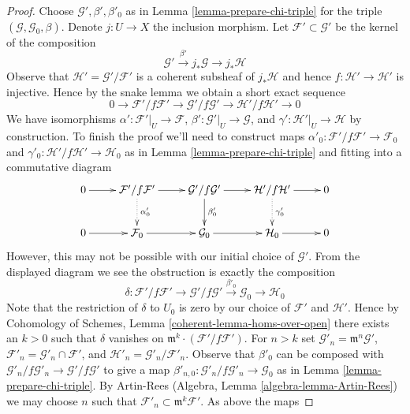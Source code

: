 \documentclass{stacks-project}
\theoremstyle{plain}
\theoremstyle{definition}
\theoremstyle{remark}
\numberwithin{equation}{subsection}
\begin{document}
\begin{proof}
Choose $\mathcal{G}', \beta', \beta'_0$ as in
Lemma \ref{lemma-prepare-chi-triple}
for the triple $(\mathcal{G}, \mathcal{G}_0, \beta)$.
Denote $j : U \to X$ the inclusion morphism.
Let $\mathcal{F}' \subset \mathcal{G}'$
be the kernel of the composition
$$
\mathcal{G}' \xrightarrow{\beta'} j_*\mathcal{G} \to j_*\mathcal{H}
$$
Observe that $\mathcal{H}' = \mathcal{G}'/\mathcal{F}'$
is a coherent subsheaf of $j_*\mathcal{H}$ and hence
$f : \mathcal{H}' \to \mathcal{H}'$ is injective.
Hence by the snake lemma we obtain a short exact sequence
$$
0 \to \mathcal{F}'/f\mathcal{F}' \to
\mathcal{G}'/f\mathcal{G}' \to
\mathcal{H}'/f\mathcal{H}' \to 0
$$
We have isomorphisms
$\alpha' : \mathcal{F}'|_U \to \mathcal{F}$,
$\beta' : \mathcal{G}'|_U \to \mathcal{G}$, and
$\gamma' : \mathcal{H}'|_U \to \mathcal{H}$ by construction.
To finish the proof we'll need to construct maps
$\alpha'_0 : \mathcal{F}'/f\mathcal{F}' \to \mathcal{F}_0$ and
$\gamma'_0 : \mathcal{H}'/f\mathcal{H}' \to \mathcal{H}_0$ as in
Lemma \ref{lemma-prepare-chi-triple} and fitting into
a commutative diagram
$$
\xymatrix{
0 \ar[r] &
\mathcal{F}'/f\mathcal{F}' \ar[r] \ar@{..>}[d]^{\alpha'_0} &
\mathcal{G}'/f\mathcal{G}' \ar[r] \ar[d]^{\beta'_0} &
\mathcal{H}'/f\mathcal{H}' \ar[r] \ar@{..>}[d]^{\gamma'_0} &
0 \\
0 \ar[r] &
\mathcal{F}_0 \ar[r] &
\mathcal{G}_0 \ar[r] &
\mathcal{H}_0 \ar[r] &
0
}
$$
However, this may not be possible with our initial choice of $\mathcal{G}'$.
From the displayed diagram we see the obstruction is
exactly the composition
$$
\delta :
\mathcal{F}'/f\mathcal{F}' \to
\mathcal{G}'/f\mathcal{G}' \xrightarrow{\beta'_0}
\mathcal{G}_0 \to
\mathcal{H}_0
$$
Note that the restriction of $\delta$ to $U_0$ is zero by our choice of
$\mathcal{F}'$ and $\mathcal{H}'$. Hence by
Cohomology of Schemes, Lemma \ref{coherent-lemma-homs-over-open}
there exists an $k > 0$ such that
$\delta$ vanishes on $\mathfrak m^k \cdot (\mathcal{F}'/f\mathcal{F}')$.
For $n > k$ set $\mathcal{G}'_n = \mathfrak m^n \mathcal{G}'$,
$\mathcal{F}'_n = \mathcal{G}'_n \cap \mathcal{F}'$, and
$\mathcal{H}'_n = \mathcal{G}'_n/\mathcal{F}'_n$.
Observe that $\beta'_0$ can be composed with
$\mathcal{G}'_n/f\mathcal{G}'_n \to \mathcal{G}'/f\mathcal{G}'$
to give a map
$\beta'_{n, 0} : \mathcal{G}'_n/f\mathcal{G}'_n \to \mathcal{G}_0$
as in Lemma \ref{lemma-prepare-chi-triple}.
By Artin-Rees (Algebra, Lemma \ref{algebra-lemma-Artin-Rees})
we may choose $n$ such that
$\mathcal{F}'_n \subset \mathfrak m^k \mathcal{F}'$.
As above the maps

\end{proof}
\end{document}
